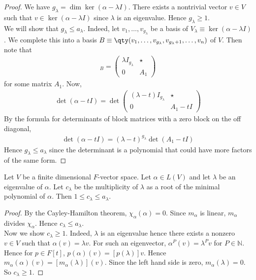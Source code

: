 \begin{proof}
	We have $g_\lambda = \dim \ker (\alpha - \lambda I)$.
	There exists a nontrivial vector $v \in V$ such that $v \in \ker(\alpha - \lambda I)$ since $\lambda$ is an eigenvalue.
	Hence $g_\lambda \geq 1$. \\
	We will show that $g_\lambda \leq a_\lambda$.
	Indeed, let $v_1, \dots, v_{g_\lambda}$ be a basis of $V_\lambda \equiv \ker (\alpha - \lambda I)$.
	We complete this into a basis $B \equiv \qty(v_1, \dots, v_{g_\lambda}, v_{g_\lambda + 1}, \dots, v_n)$ of $V$.
	Then note that
	\begin{align*}
		[\alpha]_B = \begin{pmatrix}
			\lambda I_{g_\lambda} & \star \\
			0                     & A_1
		\end{pmatrix}
	\end{align*}
	for some matrix $A_1$.
	Now,
	\begin{align*}
		\det (\alpha - tI) = \det \begin{pmatrix}
			(\lambda - t) I_{g_\lambda} & \star     \\
			0                           & A_1 - t I
		\end{pmatrix}
	\end{align*}
	By the formula for determinants of block matrices with a zero block on the off diagonal,
	\begin{align*}
		\det (\alpha - tI) = (\lambda-t)^{g_\lambda} \det(A_1 - t I)
	\end{align*}
	Hence $g_\lambda \leq a_\lambda$ since the determinant is a polynomial that could have more factors of the same form.
\end{proof}
\begin{lemma}
	Let $V$ be a finite dimensional $F$-vector space.
	Let $\alpha \in L(V)$ and let $\lambda$ be an eigenvalue of $\alpha$.
	Let $c_\lambda$ be the multiplicity of $\lambda$ as a root of the minimal polynomial of $\alpha$.
	Then $1 \leq c_\lambda \leq a_\lambda$.
\end{lemma}
\begin{proof}
	By the Cayley-Hamilton theorem, $\chi_\alpha(\alpha) = 0$.
	Since $m_\alpha$ is linear, $m_\alpha$ divides $\chi_\alpha$.
	Hence $c_\lambda \leq a_\lambda$. \\
	Now we show $c_\lambda \geq 1$.
	Indeed, $\lambda$ is an eigenvalue hence there exists a nonzero $v \in V$ such that $\alpha(v) = \lambda v$.
	For such an eigenvector, $\alpha^P(v) = \lambda^P v$ for $P \in \mathbb N$.
	Hence for $p \in F[t]$, $p(\alpha)(v) = [p(\lambda)]v$.
	Hence $m_\alpha(\alpha)(v) = [m_\alpha(\lambda)](v)$.
	Since the left hand side is zero, $m_\alpha(\lambda) = 0$.
	So $c_\lambda \geq 1$.
\end{proof}

